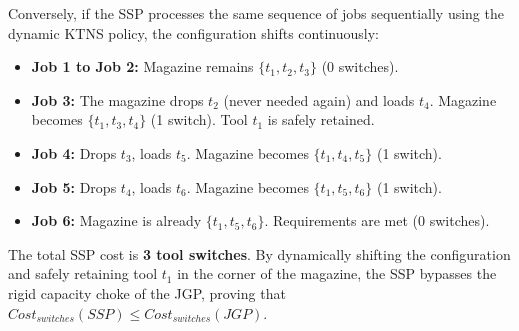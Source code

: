 \documentclass[12pt]{article}
\begin{document}
Conversely, if the SSP processes the same sequence of jobs sequentially using the dynamic KTNS policy, the configuration shifts continuously:
\begin{itemize}[noitemsep]
	\item \textbf{Job 1 to Job 2:} Magazine remains $\{t_1, t_2, t_3\}$ (0 switches).
	\item \textbf{Job 3:} The magazine drops $t_2$ (never needed again) and loads $t_4$. Magazine becomes $\{t_1, t_3, t_4\}$ (1 switch). Tool $t_1$ is safely retained.
	\item \textbf{Job 4:} Drops $t_3$, loads $t_5$. Magazine becomes $\{t_1, t_4, t_5\}$ (1 switch).
	\item \textbf{Job 5:} Drops $t_4$, loads $t_6$. Magazine becomes $\{t_1, t_5, t_6\}$ (1 switch).
	\item \textbf{Job 6:} Magazine is already $\{t_1, t_5, t_6\}$. Requirements are met (0 switches).
\end{itemize}
The total SSP cost is \textbf{3 tool switches}. By dynamically shifting the configuration and safely retaining tool $t_1$ in the corner of the magazine, the SSP bypasses the rigid capacity choke of the JGP, proving that $Cost_{switches}(SSP) \le Cost_{switches}(JGP)$.
\end{document}
